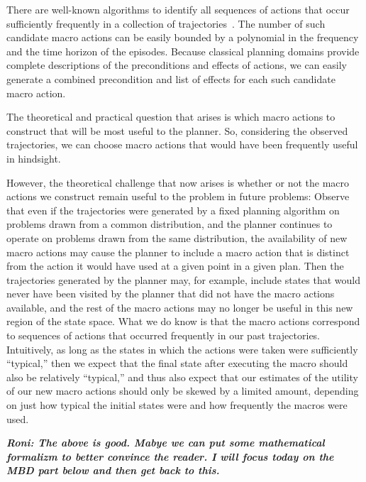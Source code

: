 \documentclass[12pt]{article}
\newcommand{\note}[1]{\textbf{\textit{#1}}}
\begin{document}
There are well-known algorithms to identify all sequences of actions that occur sufficiently frequently in a collection of trajectories~\cite{mannila1997sequences}. The number of such candidate macro actions can be easily bounded by a polynomial in the frequency and the time horizon of the episodes. Because classical planning domains provide complete descriptions of the preconditions and effects of actions, we can easily generate a combined precondition and list of effects for each such candidate macro action.

The theoretical and practical question that arises is which macro actions to construct that will be most useful to the planner. 
So, considering the observed trajectories, we can choose macro actions that would have been frequently useful in hindsight. 

However, the theoretical challenge that now arises is whether or not the macro actions we construct remain useful to the problem in future problems: Observe that even if the trajectories were generated by a fixed planning algorithm on problems drawn from a common distribution, and the planner continues to operate on problems drawn from the same distribution, the availability of new macro actions may cause the planner to include a macro action that is distinct from the action it would have used at a given point in a given plan. Then the trajectories generated by the planner may, for example, include states that would never have been visited by the planner that did not have the macro actions available, and the rest of the macro actions may no longer be useful in this new region of the state space. What we do know is that the macro actions correspond to sequences of actions that occurred frequently in our past trajectories. Intuitively, as long as the states in which the actions were taken were sufficiently ``typical,'' then we expect that the final state after executing the macro should also be relatively ``typical,'' and thus also expect that our estimates of the utility of our new macro actions should only be skewed by a limited amount, depending on just how typical the initial states were and how frequently the macros were used.


\note{Roni: The above is good. Mabye we can put some mathematical formalizm to better convince the reader. I will focus today on the MBD part below and then get back to this.}
\end{document}
